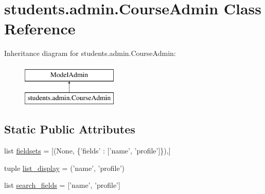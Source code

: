 \hypertarget{classstudents_1_1admin_1_1_course_admin}{\section{students.\-admin.\-Course\-Admin Class Reference}
\label{classstudents_1_1admin_1_1_course_admin}
}
Inheritance diagram for students.\-admin.\-Course\-Admin\-:\begin{figure}[H]
\begin{center}
\leavevmode
\includegraphics[height=2.000000cm]{classstudents_1_1admin_1_1_course_admin}
\end{center}
\end{figure}
\subsection*{Static Public Attributes}
\begin{DoxyCompactItemize}
\item 
list \hyperlink{classstudents_1_1admin_1_1_course_admin_a2d298dca126bc069d952e3b203c7ff9a}{fieldsets} = \mbox{[}(None, \{'fields' \-: \mbox{[}'name', 'profile'\mbox{]}\}),\mbox{]}
\item 
tuple \hyperlink{classstudents_1_1admin_1_1_course_admin_a2875b817163ff5678d1325780528df79}{list\-\_\-display} = ('name', 'profile')
\item 
list \hyperlink{classstudents_1_1admin_1_1_course_admin_aafd6b90008831c42064c629a6a6ff294}{search\-\_\-fields} = \mbox{[}'name', 'profile'\mbox{]}
\end{DoxyCompactItemize}


